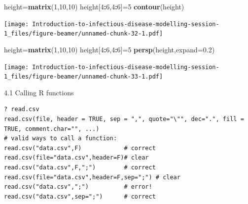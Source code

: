 \documentclass[
  ignorenonframetext,
]{beamer}
\newenvironment{Shaded}{\begin{snugshade}}{\end{snugshade}}
\newcommand{\AttributeTok}[1]{\textcolor[rgb]{0.13,0.29,0.53}{#1}}
\newcommand{\DecValTok}[1]{\textcolor[rgb]{0.00,0.00,0.81}{#1}}
\newcommand{\FloatTok}[1]{\textcolor[rgb]{0.00,0.00,0.81}{#1}}
\newcommand{\FunctionTok}[1]{\textcolor[rgb]{0.13,0.29,0.53}{\textbf{#1}}}
\newcommand{\NormalTok}[1]{#1}
\newcommand{\OtherTok}[1]{\textcolor[rgb]{0.56,0.35,0.01}{#1}}
\newcommand{\SpecialCharTok}[1]{\textcolor[rgb]{0.81,0.36,0.00}{\textbf{#1}}}
\begin{document}
\begin{frame}[fragile]
\begin{Shaded}
\begin{Highlighting}[]
\NormalTok{height}\OtherTok{=}\FunctionTok{matrix}\NormalTok{(}\DecValTok{1}\NormalTok{,}\DecValTok{10}\NormalTok{,}\DecValTok{10}\NormalTok{)}
\NormalTok{height[}\DecValTok{4}\SpecialCharTok{:}\DecValTok{6}\NormalTok{,}\DecValTok{4}\SpecialCharTok{:}\DecValTok{6}\NormalTok{]}\OtherTok{=}\DecValTok{5}
\FunctionTok{contour}\NormalTok{(height)}
\end{Highlighting}
\end{Shaded}

\texttt{[image: Introduction-to-infectious-disease-modelling-session-1\_files/figure-beamer/unnamed-chunk-32-1.pdf]}
\end{frame}

\begin{frame}[fragile]
\begin{Shaded}
\begin{Highlighting}[]
\NormalTok{height}\OtherTok{=}\FunctionTok{matrix}\NormalTok{(}\DecValTok{1}\NormalTok{,}\DecValTok{10}\NormalTok{,}\DecValTok{10}\NormalTok{)}
\NormalTok{height[}\DecValTok{4}\SpecialCharTok{:}\DecValTok{6}\NormalTok{,}\DecValTok{4}\SpecialCharTok{:}\DecValTok{6}\NormalTok{]}\OtherTok{=}\DecValTok{5}
\FunctionTok{persp}\NormalTok{(height,}\AttributeTok{expand=}\FloatTok{0.2}\NormalTok{)}
\end{Highlighting}
\end{Shaded}

\texttt{[image: Introduction-to-infectious-disease-modelling-session-1\_files/figure-beamer/unnamed-chunk-33-1.pdf]}
\end{frame}

\begin{frame}[fragile]{4.1 Calling R functions}
\protect\hypertarget{calling-r-functions}{}
\begin{verbatim}
? read.csv 
read.csv(file, header = TRUE, sep = ",", quote="\"", dec=".", fill = TRUE, comment.char="", ...)   
# valid ways to call a function:
read.csv("data.csv",F)            # correct
read.csv(file="data.csv",header=F)# clear
read.csv("data.csv",F,";")        # correct
read.csv(file="data.csv",header=F,sep=";") # clear
read.csv("data.csv",";")          # error!
read.csv("data.csv",sep=";")      # correct
\end{verbatim}
\end{frame}
\end{document}

